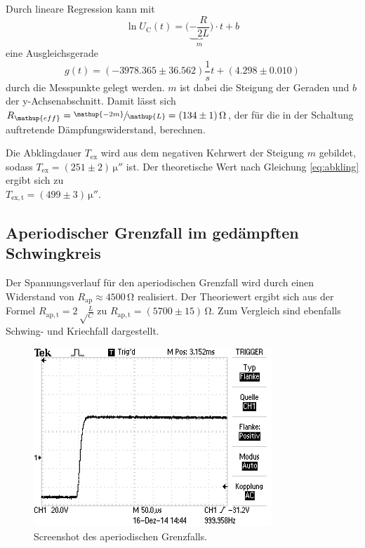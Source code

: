 Durch lineare Regression kann mit
\begin{equation}
\ln{U_\mathup{C}}(t)=\bigl(\underbrace{-\frac{R}{2L}}_m\bigr)\cdot t +b
\end{equation}
eine Ausgleichsgerade 
\begin{equation}
g(t)=(-3978.365\pm 36.562)\frac{1}{s} t + (4.298\pm0.010)
\end{equation}
durch die Messpunkte gelegt werden. 
$m$ ist dabei die Steigung der Geraden und $b$ der y-Achsenabschnitt.
Damit lässt sich $R_\mathup{eff}=\sfrac{\mathup{-2m}}{\mathup{L}}=(134\pm1)\,\si\ohm$, der für die in der Schaltung auftretende Dämpfungswiderstand, berechnen. 

Die Abklingdauer $T_\mathup{ex}$ wird aus dem negativen Kehrwert der Steigung $m$ gebildet, sodass $T_\mathup{ex}=(251\pm2)\,\si{\micro{\second}}$ ist.
Der theoretische Wert nach Gleichung \eqref{eq:abkling} ergibt sich zu \\$T_\mathup{ex,t}=(499\pm3)\,\si{\micro{\second}}$.


\subsection{Aperiodischer Grenzfall im gedämpften Schwingkreis}
Der Spannungsverlauf für den aperiodischen Grenzfall wird durch einen Widerstand von $R_\mathup{ap}\approx4500\,\si\ohm$ realisiert. 
Der Theoriewert ergibt sich aus der Formel $R_\mathup{ap,t}=2\sqrt\frac{L}{C}$ zu $R_\mathup{ap,t}=(5700\pm15)\,\si\ohm$.
 Zum Vergleich sind ebenfalls Schwing- und Kriechfall dargestellt.
\newpage
\begin{figure}[h]
		\centering
		\includegraphics[width=0.8\textwidth]{Bilder/Aperiodischer.JPG}
		\caption{Screenshot des aperiodischen Grenzfalls.}
\end{figure}

